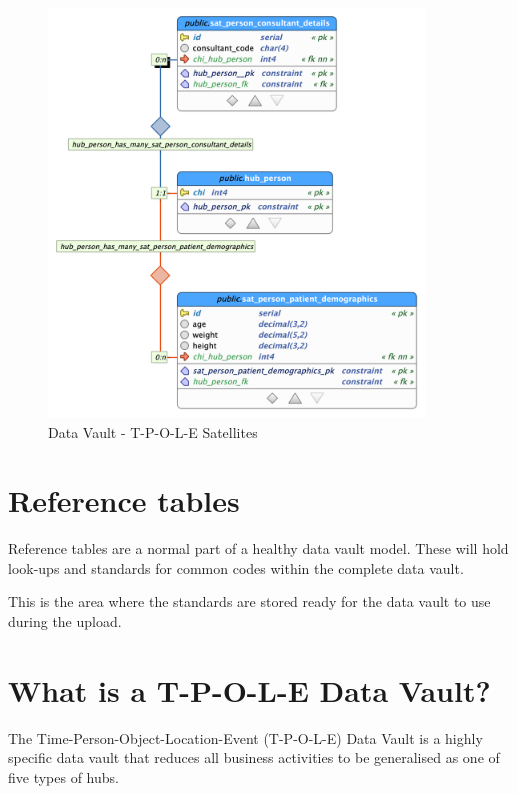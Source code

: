 \begin{itemize}

\begin{figure}[H]
    \centering
    \includegraphics[width=10cm]{figures/technical/satellites.png}
    \caption{Data Vault - T-P-O-L-E Satellites}
    \label{fig:dvsatellites}
\end{figure}
\end{itemize}



\section{Reference tables}

Reference tables are a normal part of a healthy data vault model. These will hold look-ups and standards for common codes within the complete data vault.

This is the area where the standards are stored ready for the data vault to use during the upload.

\section{What is a T-P-O-L-E Data Vault?}

The Time-Person-Object-Location-Event (T-P-O-L-E) Data Vault is a highly specific data vault that reduces all business activities to be generalised as one of five types of hubs.

